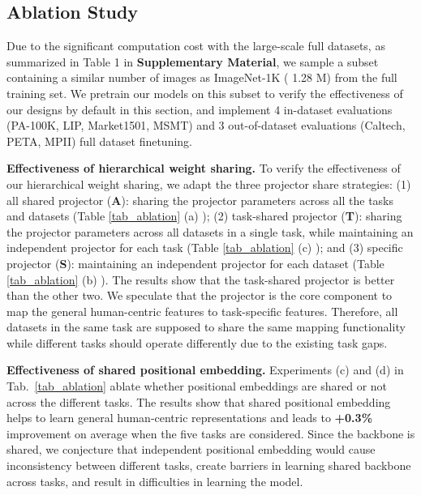 \documentclass[10pt,twocolumn,letterpaper]{article}
\begin{document}
\subsection{Ablation Study} \label{sec:ablation}
 Due to the significant computation cost with the large-scale full datasets, as summarized in Table 1 in \textbf{Supplementary Material}, we sample a subset containing a similar number of images as ImageNet-1K ( 1.28 M) from the full training set. We pretrain our models on this subset to verify the effectiveness of our designs by default in this section, and implement 4 in-dataset evaluations (PA-100K, LIP, Market1501, MSMT) and 3 out-of-dataset evaluations (Caltech, PETA, MPII) full dataset finetuning.

\noindent \textbf{Effectiveness of hierarchical weight sharing.}
To verify the effectiveness of our hierarchical weight sharing, we adapt the three projector share strategies: (1) all shared projector (\textbf{A}): sharing the projector parameters across all the tasks and datasets (Table \ref{tab_ablation} (a) ); (2) task-shared projector (\textbf{T}): sharing the projector parameters across all datasets in a single task, while maintaining an independent projector for each task (Table \ref{tab_ablation} (c) ); and (3) specific projector (\textbf{S}): maintaining an independent projector for each dataset (Table \ref{tab_ablation} (b) ).  The results show that the task-shared projector is better than the other two. We speculate that the projector is the core component to map the general human-centric features to task-specific features. Therefore, all datasets in the same task are supposed to share the same mapping functionality while different tasks 
should operate differently due to the existing task gaps.




\noindent \textbf{Effectiveness of shared positional embedding.}
Experiments (c) and (d) in Tab.~\ref{tab_ablation} ablate whether positional embeddings are shared or not across the different tasks. The results show that shared positional embedding helps to learn general human-centric representations and leads to \textbf{+0.3\%} improvement on average when the five tasks are considered. Since the backbone is shared, we conjecture that independent positional embedding would cause inconsistency between different tasks, create barriers in learning shared backbone across tasks, and result in difficulties in learning the model.
\end{document}

